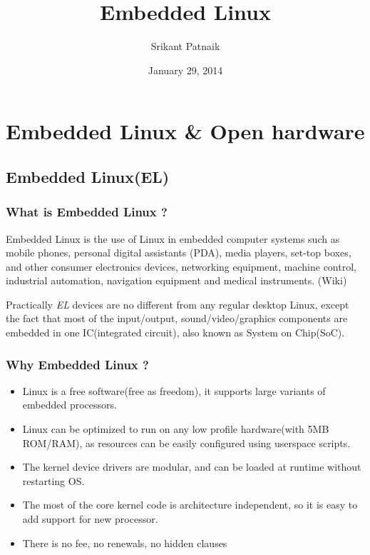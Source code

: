 \documentclass[letterpaper,10pt,english]{sphinxmanual}
\title{Embedded Linux}
\date{January 29, 2014}
\author{Srikant Patnaik}
\begin{document}
\maketitle
\tableofcontents
{}\label{index::doc}



\part{Embedded Linux \& Open hardware}
\label{embedded-linux:embedded-linux}\label{embedded-linux::doc}\label{embedded-linux:embedded-linux-open-hardware}

\chapter{Embedded Linux(EL)}
\label{embedded-linux:embedded-linux-el}

\section{What is Embedded Linux ?}
\label{embedded-linux:what-is-embedded-linux}
Embedded Linux is the use of Linux in embedded computer systems such as mobile
phones, personal digital assistants (PDA), media players, set-top boxes, and
other consumer electronics devices, networking equipment, machine control,
industrial automation, navigation equipment and medical instruments. (Wiki)

Practically \emph{EL} devices are no different from any regular desktop Linux,
except the fact that most of the input/output, sound/video/graphics components
are embedded in one IC(integrated circuit), also known as System on Chip(SoC).


\section{Why Embedded Linux ?}
\label{embedded-linux:why-embedded-linux}\begin{itemize}
\item {} 
Linux is a free software(free as freedom), it supports large variants of
embedded processors.

\item {} 
Linux can be optimized to run on any low profile hardware(with 5MB ROM/RAM),
as resources can be easily configured using userspace scripts.

\item {} 
The kernel device drivers are modular, and can be loaded at runtime without restarting OS.

\item {} 
The most of the core kernel code is architecture independent, so it is easy to add support for
new processor.

\item {} 
There is no fee, no renewals, no hidden clauses

\end{itemize}
\end{document}

